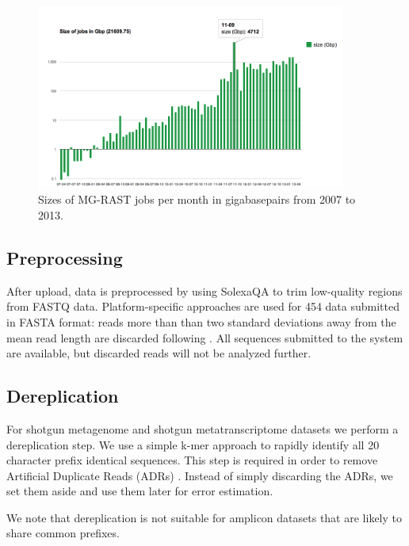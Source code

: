 \documentclass[12pt,fullpage]{report}
\begin{document}
\begin{figure}
\begin{center}
\includegraphics[width=4in]{Images/MG-RAST-job-sizes}
\end{center}
\caption{
Sizes of MG-RAST jobs per month in gigabasepairs from 2007 to 2013.}
\label{fig:mgrast-job-sizes}
\end{figure}

\subsection{Preprocessing}
After upload, data is preprocessed by using SolexaQA \cite{SOLEXAQA} to trim low-quality regions from FASTQ data. Platform-specific approaches are used for 454 data submitted in FASTA format: reads more than than two standard deviations away from the mean read length are discarded following \cite{HUSEPYRO}. All sequences submitted to the system are available, but discarded reads will not be analyzed further.
\subsection{Dereplication}
For shotgun metagenome and shotgun metatranscriptome datasets we perform a dereplication step.
We use a simple k-mer approach to rapidly identify all 20 character prefix identical sequences.
This step is required in order to remove Artificial Duplicate Reads (\gls{ADR}s) \cite{ADRS}. Instead of simply discarding the ADRs, we set them aside and use them later for error estimation.

We note that dereplication is not suitable for amplicon datasets that are likely to share common prefixes.
\end{document}
